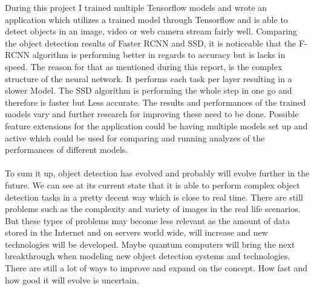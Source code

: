 
During this project I trained multiple Tensorflow models and wrote an application which utilizes a trained model through Tensorflow and is
able to detect objects in an image, video or web camera stream fairly well. Comparing the object detection results of Faster RCNN and SSD,
it is noticeable that the F-RCNN algorithm is performing better in regards to accuracy but is lacks in speed. The reason for that as mentioned during this report, is the complex
structure of the neural network. It performs each task per layer resulting in a slower Model. The SSD algorithm is performing the whole step in one go
and therefore is faster but Less accurate. The results and performances of the trained models vary and further
research for improving these need to be done. Possible feature extensions for the application could be having multiple models set up and
active which could be used for comparing and running analyzes of the performances of different models.\\\\
To sum it up, object detection has evolved and probably will evolve further in the future. We can see at its current state that it is able
to perform complex object detection tasks in a pretty decent way which is close to real time. There are still problems such as the
complexity and variety of images in the real life scenarios. But these types of problems may become less relevant as the amount
of data stored in the Internet and on servers world wide, will increase and new technologies will be developed. Maybe quantum computers
will bring the next breakthrough when modeling new object detection systems and technologies. There are still a lot of ways to improve and
expand on the concept. How fast and how good it will evolve is uncertain.


